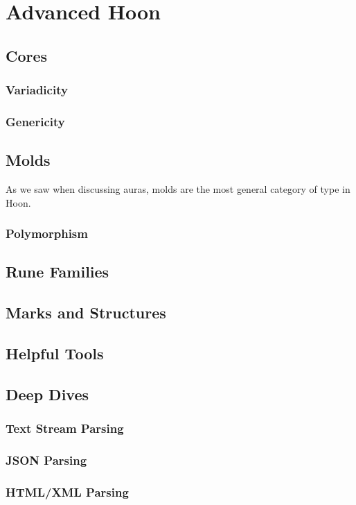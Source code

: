 \setchapterpreamble[u]{\margintoc}
\chapter{Advanced Hoon}


\section{Cores}

\subsection{Variadicity}

\subsection{Genericity}

\section{Molds}

As we saw when discussing auras, molds are the most general category of type in Hoon.


\subsection{Polymorphism}

\section{Rune Families}

\section{Marks and Structures}

\section{Helpful Tools}


\section{Deep Dives}

\subsection{Text Stream Parsing}

\subsection{JSON Parsing}

\subsection{HTML/XML Parsing}
